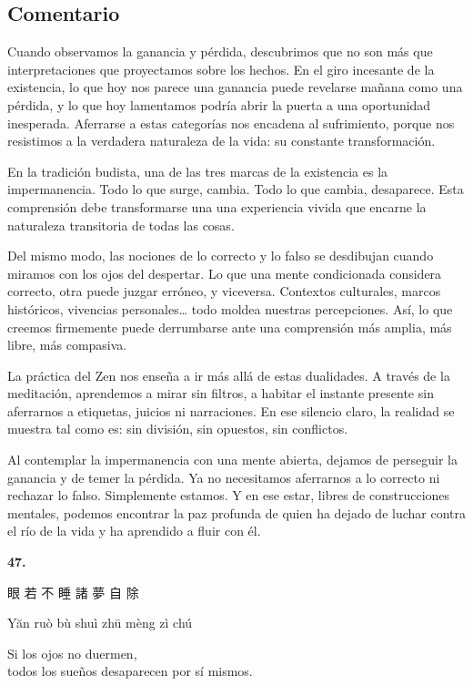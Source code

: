 \documentclass[
  a5paperpaper,
]{article}
\begin{document}
\hfill\break

\hypertarget{comentario-45}{%
\subsection{Comentario}\label{comentario-45}}

Cuando observamos la ganancia y pérdida, descubrimos que no son más que
interpretaciones que proyectamos sobre los hechos. En el giro incesante
de la existencia, lo que hoy nos parece una ganancia puede revelarse
mañana como una pérdida, y lo que hoy lamentamos podría abrir la puerta
a una oportunidad inesperada. Aferrarse a estas categorías nos encadena
al sufrimiento, porque nos resistimos a la verdadera naturaleza de la
vida: su constante transformación.

En la tradición budista, una de las tres marcas de la existencia es la
impermanencia. Todo lo que surge, cambia. Todo lo que cambia,
desaparece. Esta comprensión debe transformarse una una experiencia
vivida que encarne la naturaleza transitoria de todas las cosas.

Del mismo modo, las nociones de lo correcto y lo falso se desdibujan
cuando miramos con los ojos del despertar. Lo que una mente condicionada
considera correcto, otra puede juzgar erróneo, y viceversa. Contextos
culturales, marcos históricos, vivencias personales\ldots{} todo moldea
nuestras percepciones. Así, lo que creemos firmemente puede derrumbarse
ante una comprensión más amplia, más libre, más compasiva.

La práctica del Zen nos enseña a ir más allá de estas dualidades. A
través de la meditación, aprendemos a mirar sin filtros, a habitar el
instante presente sin aferrarnos a etiquetas, juicios ni narraciones. En
ese silencio claro, la realidad se muestra tal como es: sin división,
sin opuestos, sin conflictos.

Al contemplar la impermanencia con una mente abierta, dejamos de
perseguir la ganancia y de temer la pérdida. Ya no necesitamos
aferrarnos a lo correcto ni rechazar lo falso. Simplemente estamos. Y en
ese estar, libres de construcciones mentales, podemos encontrar la paz
profunda de quien ha dejado de luchar contra el río de la vida y ha
aprendido a fluir con él.

\hfill\break

\hypertarget{02}{}
\begin{verseblock}

\newpage

\begin{center}\textbf{47.}\end{center}

眼 若 不 睡 諸 夢 自 除

Yăn ruò bù shuì zhū mèng zì chú

Si los ojos no duermen,\\
todos los sueños desaparecen por sí mismos.

\end{verseblock}
\end{document}
